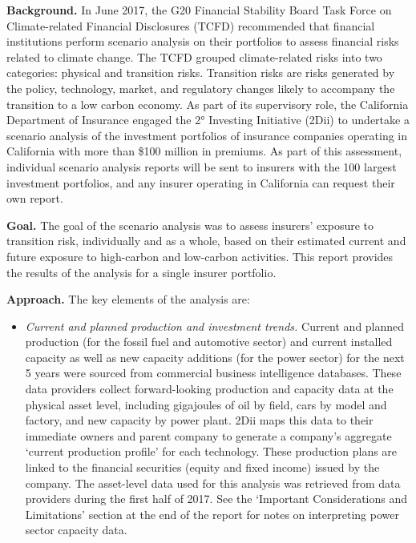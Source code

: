 \documentclass[10pt,table,a4]{article}\usepackage[]{graphicx}\usepackage[]{color}
\begin{document}
	\begin{multicols}{2}
		\textbf{Background.} In June 2017, the G20 Financial Stability Board Task Force on Climate-related Financial Disclosures (TCFD) recommended that financial institutions perform scenario analysis on their portfolios to assess financial risks related to climate change. The TCFD grouped climate-related risks into two categories: physical and transition risks. Transition risks are risks generated by the policy, technology, market, and regulatory changes likely to accompany the transition to a low carbon economy. As part of its supervisory role, the California Department of Insurance engaged the 2° Investing Initiative (2Dii) to undertake a scenario analysis of the investment portfolios of insurance companies operating in California with more than \$100 million in premiums.  As part of this assessment, individual scenario analysis reports will be sent to insurers with the 100 largest investment portfolios, and any insurer operating in California can request their own report.
		
		\textbf{Goal.} The goal of the scenario analysis was to assess insurers' exposure to transition risk, individually and as a whole, based on their estimated current and future exposure to high-carbon and low-carbon activities. This report provides the results of the analysis for a single insurer portfolio.
		
		\textbf{Approach.} The key elements of the analysis are:
		
		\begin{itemize}
			\item{\textit{Current and planned production and investment trends.} Current and planned production (for the fossil fuel and automotive sector) and current installed capacity as well as new capacity additions (for the power sector) for the next 5 years were sourced from commercial business intelligence databases. These data providers collect forward-looking production and capacity data at the physical asset level, including gigajoules of oil by field, cars by model and factory, and new capacity by power plant. 2Dii maps this data to their immediate owners and parent company to generate a company's aggregate `current production profile' for each technology. These production plans are linked to the financial securities (equity and fixed income) issued by the company. The asset-level data used for this analysis was retrieved from data providers during the first half of 2017. See the `Important Considerations and Limitations' section at the end of the report for notes on interpreting power sector capacity data.}
			

\end{itemize}
\end{multicols}
\end{document}
